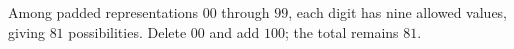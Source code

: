 Among padded representations $00$ through $99$, each digit has nine allowed values, giving $81$ possibilities. Delete $00$ and add $100$; the total remains $\boxed{81}$.

